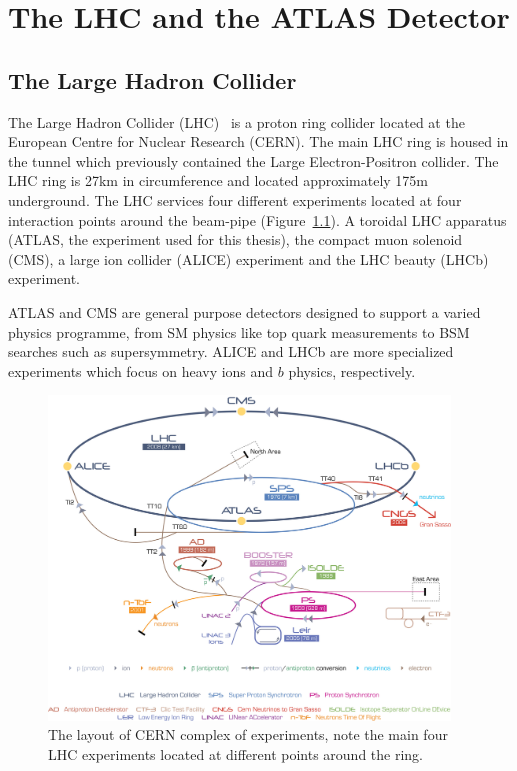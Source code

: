 
\newcommand{\microm}{\ensuremath{\mu m}}
\newcommand{\rphi}{$R$-$\phi$}

\chapter{The LHC and the ATLAS Detector} \label{sec:lhc_atlas_detector}

\section{The Large Hadron Collider} \label{sec:the_large_hadron_collider}

The Large Hadron Collider (LHC)~\cite{LHC} is a proton ring collider located at the European Centre for Nuclear Research (CERN). The main LHC ring is housed in the tunnel which previously contained the Large Electron-Positron collider. The LHC ring is 27km in circumference and located approximately 175m underground. The LHC services four different experiments located at four interaction points around the beam-pipe (Figure~\ref{fig:DetectorLHCLayout}). A toroidal LHC apparatus (ATLAS, the experiment used for this thesis), the compact muon solenoid (CMS), a large ion collider (ALICE) experiment and the LHC beauty (LHCb) experiment. 

ATLAS and CMS are general purpose detectors designed to support a varied physics programme, from SM physics like top quark measurements to BSM searches such as supersymmetry. ALICE and LHCb are more specialized experiments which focus on heavy ions and $b$ physics, respectively.

\begin{figure}[htbp]
  \centering
  \includegraphics[width=0.95\textwidth]{PartDetector/Diagrams/Cern-Accelerator-Complex.jpg}
  \caption{The layout of CERN complex of experiments, note the main four LHC experiments located at different points around the ring.}
  \label{fig:DetectorLHCLayout}
\end{figure}

